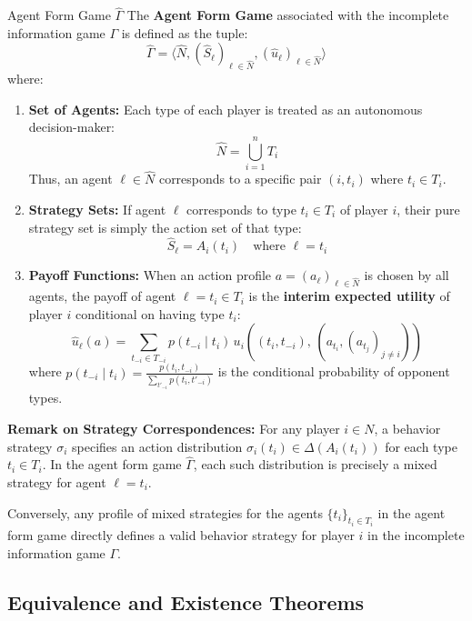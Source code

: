 \documentclass[12pt, a4paper]{article}
\begin{document}
\begin{defbox}{Agent Form Game $\hat{\Gamma}$}
The \textbf{Agent Form Game} associated with the incomplete information game $\Gamma$ is defined as the tuple:
\[
  \hat{\Gamma} = \langle \hat{N}, (\hat{S}_\ell)_{\ell \in \hat{N}}, (\hat{u}_\ell)_{\ell \in \hat{N}} \rangle
\]
where:
\begin{enumerate}
    \item \textbf{Set of Agents:} Each type of each player is treated as an autonomous decision-maker:
    \[
      \hat{N} = \bigcup_{i=1}^n T_i
    \]
    Thus, an agent $\ell \in \hat{N}$ corresponds to a specific pair $(i, t_i)$ where $t_i \in T_i$.
    \item \textbf{Strategy Sets:} If agent $\ell$ corresponds to type $t_i \in T_i$ of player $i$, their pure strategy set is simply the action set of that type:
    \[
      \hat{S}_\ell = A_i(t_i) \quad \text{where } \ell = t_i
    \]
    \item \textbf{Payoff Functions:} When an action profile $a = (a_\ell)_{\ell \in \hat{N}}$ is chosen by all agents, the payoff of agent $\ell = t_i \in T_i$ is the \textbf{interim expected utility} of player $i$ conditional on having type $t_i$:
    \[
      \hat{u}_\ell(a) = \sum_{t_{-i} \in T_{-i}} p(t_{-i} \mid t_i) \, u_i\!\left( (t_i, t_{-i}),\, (a_{t_i}, (a_{t_j})_{j \neq i}) \right)
    \]
    where $p(t_{-i} \mid t_i) = \frac{p(t_i, t_{-i})}{\sum_{t'_{-i}} p(t_i, t'_{-i})}$ is the conditional probability of opponent types.
\end{enumerate}
\end{defbox}

\begin{notebox}
\textbf{Remark on Strategy Correspondences:}
For any player $i \in N$, a behavior strategy $\sigma_i$ specifies an action distribution $\sigma_i(t_i) \in \Delta(A_i(t_i))$ for each type $t_i \in T_i$. In the agent form game $\hat{\Gamma}$, each such distribution is precisely a mixed strategy for agent $\ell = t_i$. 

Conversely, any profile of mixed strategies for the agents $\{t_i\}_{t_i \in T_i}$ in the agent form game directly defines a valid behavior strategy for player $i$ in the incomplete information game $\Gamma$.
\end{notebox}

\subsection{Equivalence and Existence Theorems}
\end{document}

